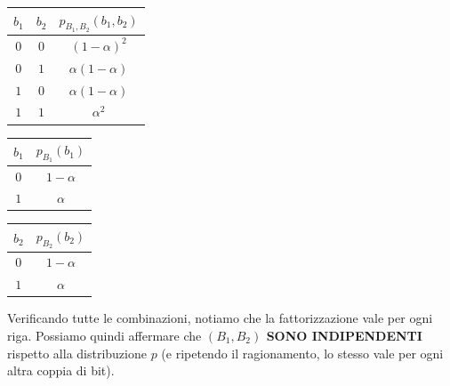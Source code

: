 \begin{table}[h]
    \centering
    \begin{tabular}{|cc|c|}
        \hline
        $b_1$ & $b_2$ & $p_{B_1, B_2}(b_1, b_2)$ \\
        \hline
        $0$ & $0$ & $(1-\alpha)^2$ \\
        $0$ & $1$ & $\alpha(1-\alpha)$ \\
        $1$ & $0$ & $\alpha(1-\alpha)$ \\
        $1$ & $1$ & $\alpha^2$ \\
        \hline
    \end{tabular}
    \quad
    \begin{tabular}{|c|c|}
        \hline
        $b_1$ & $p_{B_1}(b_1)$ \\
        \hline
        $0$ & $1-\alpha$ \\
        $1$ & $\alpha$ \\
        \hline
    \end{tabular}
    \quad
    \begin{tabular}{|c|c|}
        \hline
        $b_2$ & $p_{B_2}(b_2)$ \\
        \hline
        $0$ & $1-\alpha$ \\
        $1$ & $\alpha$ \\
        \hline
    \end{tabular}
\end{table}

Verificando tutte le combinazioni, notiamo che la fattorizzazione vale per ogni riga. Possiamo quindi affermare che \textbf{$(B_1, B_2)$ SONO INDIPENDENTI} rispetto alla distribuzione $p$ (e ripetendo il ragionamento, lo stesso vale per ogni altra coppia di bit).

